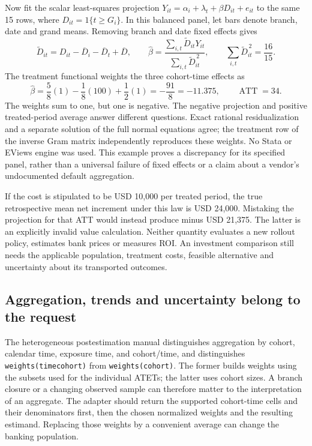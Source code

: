 Now fit the scalar least-squares projection
\(Y_{it}=\alpha_i+\lambda_t+\beta D_{it}+e_{it}\) to the same 15 rows,
where \(D_{it}=1\{t\geq G_i\}\). In this balanced panel, let bars denote
branch, date and grand means. Removing branch and date fixed effects gives
\begin{equation}
\label{exec18:gp-fwl}
 \widetilde D_{it}=D_{it}-\overline D_i-\overline D_t+\overline D,
 \qquad
 \widehat\beta=\frac{\sum_{i,t}\widetilde D_{it}Y_{it}}
                         {\sum_{i,t}\widetilde D_{it}^{\,2}},
 \qquad \sum_{i,t}\widetilde D_{it}^{\,2}=\frac{16}{15}.
\end{equation}
The treatment functional weights the three cohort-time effects as
\begin{equation}
\label{exec18:gp-negative-weight}
 \widehat\beta=\frac58(1)-\frac18(100)+\frac12(1)
              =-\frac{91}{8}=-11.375,
 \qquad \operatorname{ATT}=34.
\end{equation}
The weights sum to one, but one is negative. The negative projection and
positive treated-period average answer different questions. Exact rational
residualization and a separate solution of the full normal equations agree;
the treatment row of the inverse Gram matrix independently reproduces these
weights. No Stata or EViews engine was used. This example proves a discrepancy
for its specified panel, rather than a universal failure of fixed effects
or a claim about a vendor's undocumented default aggregation.
\citep{exec18_gp_panel_reference}

If the cost is stipulated to be USD 10,000 per treated period, the true
retrospective mean net increment under this law is USD 24,000. Mistaking
the projection for that ATT would instead produce minus USD 21,375.
The latter is an explicitly invalid value calculation. Neither quantity
evaluates a new rollout policy, estimates bank prices or measures ROI.
An investment comparison still needs the applicable population, treatment
costs, feasible alternative and uncertainty about its transported outcomes.
\citep{exec18_gp_panel_reference}

\subsection{Aggregation, trends and uncertainty belong to the request}

The heterogeneous postestimation manual distinguishes aggregation by cohort,
calendar time, exposure time, and cohort/time, and distinguishes
\texttt{weights(timecohort)} from \texttt{weights(cohort)}. The former builds
weights using the subsets used for the individual ATETs; the latter uses
cohort sizes. A branch closure or a changing observed sample can therefore
matter to the interpretation of an aggregate. The adapter should return
the supported cohort-time cells and their denominators first, then the
chosen normalized weights and the resulting estimand. Replacing those
weights by a convenient average can change the banking population.
\citep{exec18_gp_stata_post}

